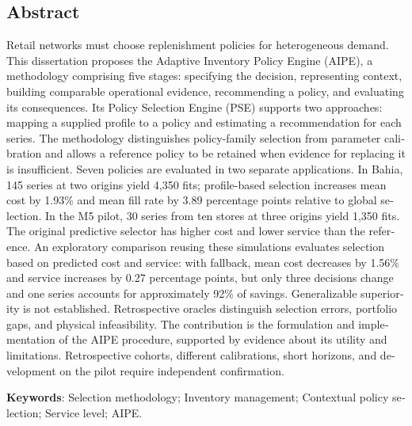 \begin{otherlanguage}{english}
\chapter*{\centering Abstract}
Retail networks must choose replenishment policies for heterogeneous demand. This dissertation proposes the Adaptive Inventory Policy Engine (AIPE), a methodology comprising five stages: specifying the decision, representing context, building comparable operational evidence, recommending a policy, and evaluating its consequences. Its Policy Selection Engine (PSE) supports two approaches: mapping a supplied profile to a policy and estimating a recommendation for each series. The methodology distinguishes policy-family selection from parameter calibration and allows a reference policy to be retained when evidence for replacing it is insufficient. Seven policies are evaluated in two separate applications. In Bahia, 145 series at two origins yield 4,350 fits; profile-based selection increases mean cost by 1.93\% and mean fill rate by 3.89 percentage points relative to global selection. In the M5 pilot, 30 series from ten stores at three origins yield 1,350 fits. The original predictive selector has higher cost and lower service than the reference. An exploratory comparison reusing these simulations evaluates selection based on predicted cost and service: with fallback, mean cost decreases by 1.56\% and service increases by 0.27 percentage points, but only three decisions change and one series accounts for approximately 92\% of savings. Generalizable superiority is not established. Retrospective oracles distinguish selection errors, portfolio gaps, and physical infeasibility. The contribution is the formulation and implementation of the AIPE procedure, supported by evidence about its utility and limitations. Retrospective cohorts, different calibrations, short horizons, and development on the pilot require independent confirmation.

\vspace{2em}
\textbf{Keywords}: Selection methodology; Inventory management; Contextual policy selection; Service level; AIPE.
\end{otherlanguage}
